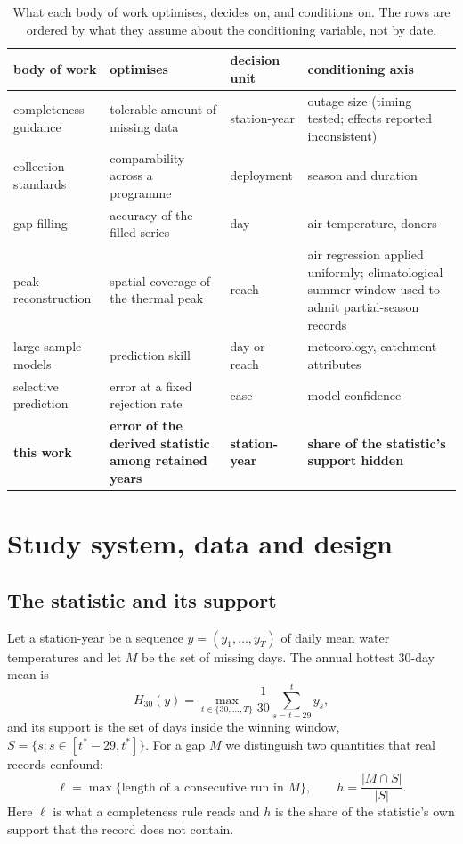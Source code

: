 \documentclass[draft]{agujournal2025}
\newcommand{\tabletext}{%
  \footnotesize
  \setlength{\baselineskip}{10pt}%
  \setlength{\parindent}{0pt}%
}
\begin{document}
\begin{table}
\caption{What each body of work optimises, decides on, and conditions on. The
rows are ordered by what they assume about the conditioning variable, not by
date.}
\label{tab:map}
\tabletext
\centering
\begin{tabularx}{\textwidth}{Y{1.15}Y{1.15}Y{0.55}Y{1.15}}
\hline
body of work & optimises & decision unit & conditioning axis \\
\hline
completeness guidance \cite{johnson2021} & tolerable amount of missing data & station-year & outage size (timing tested; effects reported inconsistent) \\
collection standards \cite{mauger2015} & comparability across a programme & deployment & season and duration \\
gap filling \cite{mohseni1998,li2017} & accuracy of the filled series & day & air temperature, donors \\
peak reconstruction \cite{beaufort2022} & spatial coverage of the thermal peak & reach & air regression applied uniformly; climatological summer window used to admit partial-season records \\
large-sample models \cite{isaak2017,corona2025,kratzert2023} & prediction skill & day or reach & meteorology, catchment attributes \\
selective prediction \cite{geifman2017,zaoui2020} & error at a fixed rejection rate & case & model confidence \\
\textbf{this work} & \textbf{error of the derived statistic among retained years} & \textbf{station-year} & \textbf{share of the statistic's support hidden} \\
\hline
\end{tabularx}
\end{table}

\section{Study system, data and design}

\subsection{The statistic and its support}

Let a station-year be a sequence $y=(y_1,\dots,y_T)$ of daily mean water
temperatures and let $M$ be the set of missing days. The annual hottest 30-day
mean is
\begin{equation}
H_{30}(y)=\max_{t\in\{30,\dots,T\}}\frac{1}{30}\sum_{s=t-29}^{t}y_s ,
\end{equation}
and its support is the set of days inside the winning window,
$S=\{s: s\in[t^\ast-29,t^\ast]\}$. For a gap $M$ we distinguish two
quantities that real records confound:
\begin{equation}
\ell=\max\{\text{length of a consecutive run in }M\},
\qquad
h=\frac{|M\cap S|}{|S|}.
\end{equation}
Here $\ell$ is what a completeness rule reads and $h$ is the share of the
statistic's own support that the record does not contain.
\end{document}
